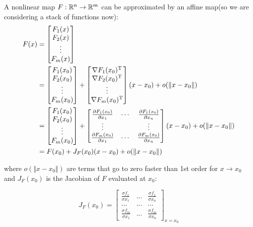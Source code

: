 A nonlinear map $F: \mathbb{R}^n \rightarrow \mathbb{R}^m$ can be approximated by an affine map(so we are considering a stack of functions now):
\begin{align*}
F(x)&=\begin{bmatrix}
F_1(x)\\
F_2(x)\\
\vdots\\
F_m(x)\\
\end{bmatrix}\\
&=
\begin{bmatrix}
F_1(x_0)\\
F_2(x_0)\\
\vdots\\
F_m(x_0)\\
\end{bmatrix}
+
\begin{bmatrix}
\nabla F_1(x_0)^{\rm T}\\
\nabla F_2(x_0)^{\rm T}\\
\vdots\\
\nabla F_m(x_0)^{\rm T}\\
\end{bmatrix}
(x-x_0)
+
o(\Vert x - x_0\Vert)\\
&=
\begin{bmatrix}
F_1(x_0)\\
F_2(x_0)\\
\vdots\\
F_m(x_0)\\
\end{bmatrix}
+
\begin{bmatrix}
\frac{\partial F_1(x_0)}{\partial x_1}&\cdots&\frac{\partial F_1(x_0)}{\partial x_n}\\
\vdots& &\vdots\\
\frac{\partial F_m(x_0)}{\partial x_1}&\cdots&\frac{\partial F_m(x_0)}{\partial x_n}
\end{bmatrix}
(x-x_0)
+
o(\Vert x - x_0\Vert)\\
&= F(x_0) + J_F(x_0)(x - x_0) + o(\Vert x - x_0\Vert)
\end{align*}

where $o(\Vert x - x_0\Vert)$ are terms that go to zero faster than 1st order for $x\rightarrow x_0$ and $J_F(x_0)$ is the Jacobian of $F$ evaluated at $x_0$:

$$J_F(x_0) = 
\left[
\begin{matrix}
\frac{\sigma f_1}{\sigma x_1} &  ... & \frac{\sigma f_1}{\sigma x_n} \\
... &  ... & ...\\
\frac{\sigma f_m}{\sigma x_1} &  ... &\frac{\sigma f_m}{\sigma x_n}
\end{matrix}
\right]_{x = x_0}
$$

